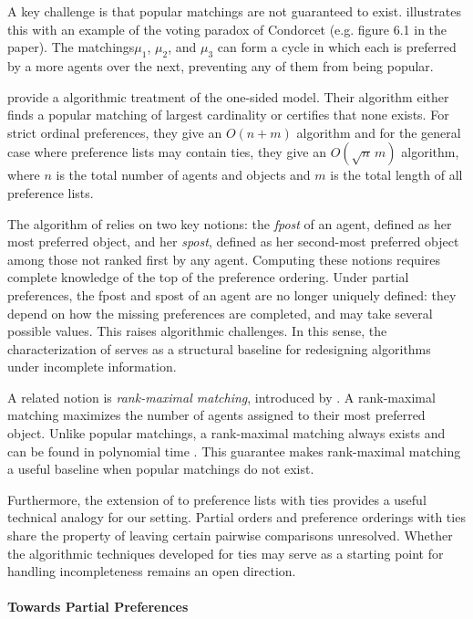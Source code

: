 \documentclass{article}
\begin{document}
A key challenge is that popular matchings are not guaranteed to exist. 
\cite{cseh2017popular} illustrates this with an example of the voting paradox of Condorcet (e.g. figure 6.1 in the paper).
The matchings$\mu_1$, $\mu_2$, and $\mu_3$ can form a cycle in which each is preferred by a more agents over the next, preventing any of them from being popular.

\cite{abraham2007popular} provide a algorithmic treatment of the one-sided model. 
Their algorithm either finds a popular matching of largest cardinality or certifies that none exists. 
For strict ordinal preferences, they give an $O(n+m)$ algorithm and for the general case where preference lists may contain ties, they give an $O(\sqrt{n}\, m)$ algorithm, where $n$ is the total number of agents and objects and $m$ is the total length of all preference lists.

The algorithm of \cite{abraham2007popular} relies on two key notions: the \emph{fpost} of an agent, defined as her most preferred object, and her \emph{spost}, defined as her second-most preferred object among those not ranked first by any agent. 
Computing these notions requires complete knowledge of the top of the preference ordering. 
Under partial preferences, the fpost and spost of an agent are no longer uniquely defined: they depend on how the missing preferences are completed, and may take several possible values. 
This raises algorithmic challenges.
In this sense, the characterization of \cite{abraham2007popular} serves as a structural baseline for redesigning algorithms under incomplete information.

A related notion is \emph{rank-maximal matching}, introduced by \cite{irving2003greedy}.
A rank-maximal matching maximizes the number of agents assigned to their most preferred object.
Unlike popular matchings, a rank-maximal matching always exists and can be found in polynomial time \citep{irving2006rank}. 
This guarantee makes rank-maximal matching a useful baseline when popular matchings do not exist.

Furthermore, the extension of \cite{abraham2007popular} to preference lists with ties provides a useful technical analogy for our setting.
Partial orders and preference orderings with ties share the property of leaving certain pairwise comparisons unresolved.
Whether the algorithmic techniques developed for ties may serve as a starting point for handling incompleteness remains an open direction.

\paragraph{Towards Partial Preferences}
\end{document}
